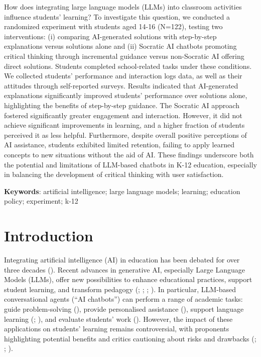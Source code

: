 \documentclass[
  11pt,
]{article}
\begin{document}
How does integrating large language models (LLMs) into classroom activities influence students' learning? To investigate this question, we conducted a randomized experiment with students aged 14-16 (N=122), testing two interventions: (i) comparing AI-generated solutions with step-by-step explanations versus solutions alone and (ii) Socratic AI chatbots promoting critical thinking through incremental guidance versus non-Socratic AI offering direct solutions. Students completed school-related tasks under these conditions. We collected students' performance and interaction logs data, as well as their attitudes through self-reported surveys. Results indicated that AI-generated explanations significantly improved students' performance over solutions alone, highlighting the benefits of step-by-step guidance. The Socratic AI approach fostered significantly greater engagement and interaction. However, it did not achieve significant improvements in learning, and a higher fraction of students perceived it as less helpful. Furthermore, despite overall positive perceptions of AI assistance, students exhibited limited retention, failing to apply learned concepts to new situations without the aid of AI. These findings underscore both the potential and limitations of LLM-based chatbots in K-12 education, especially in balancing the development of critical thinking with user satisfaction.

\textbf{Keywords}: artificial intelligence; large language models; learning; education policy; experiment; k-12

\section{Introduction}\label{introduction}

Integrating artificial intelligence (AI) in education has been debated for over three decades (). Recent advances in generative AI, especially Large Language Models (LLMs), offer new possibilities to enhance educational practices, support student learning, and transform pedagogy (; ; ; ). In particular, LLM-based conversational agents (``AI chatbots'') can perform a range of academic tasks: guide problem-solving (), provide personalised assistance (), support language learning (; ), and evaluate students' work (). However, the impact of these applications on students' learning remains controversial, with proponents highlighting potential benefits and critics cautioning about risks and drawbacks (; ; ).
\end{document}
